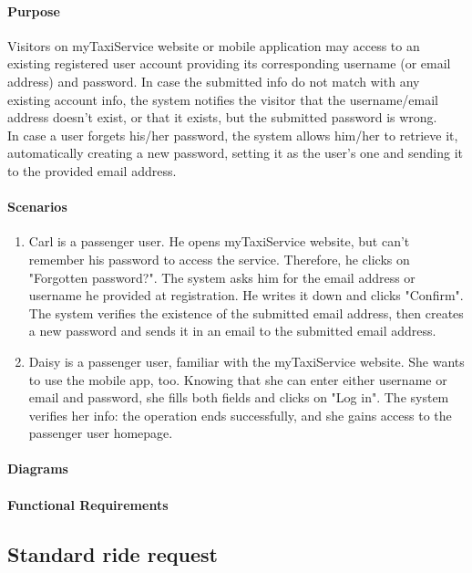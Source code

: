 \paragraph{Purpose}
Visitors on myTaxiService website or mobile application may access to an existing registered user account providing its corresponding username (or email address) and password. In case the submitted info do not match with any existing account info, the system notifies the visitor that the username/email address doesn't exist, or that it exists, but the submitted password is wrong.\\
In case a user forgets his/her password, the system allows him/her to retrieve it, automatically creating a new password, setting it as the user's one and sending it to the provided email address.

\paragraph{Scenarios}
\begin{enumerate}
	\item Carl is a passenger user. He opens myTaxiService website, but can't remember his password to access the service. Therefore, he clicks on "Forgotten password?". The system asks him for the email address or username he provided at registration. He writes it down and clicks "Confirm". The system verifies the existence of the submitted email address, then creates a new password and sends it in an email to the submitted email address.
	
	\item Daisy is a passenger user, familiar with the myTaxiService website. She wants to use the mobile app, too. Knowing that she can enter either username or email and password, she fills both fields and clicks on "Log in". The system verifies her info: the operation ends successfully, and she gains access to the passenger user homepage.
\end{enumerate}

\paragraph{Diagrams}

\paragraph{Functional Requirements}

\subsection{Standard ride request}

